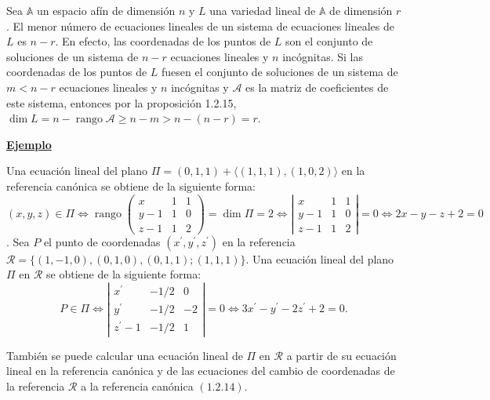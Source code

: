\documentclass[12pt, a4paper, ones, notitlepage, openany,titlepage]{article}
\newcommand{\ejemplo}{\noindent\underline{\textbf{Ejemplo}}}
\begin{document}
Sea $\mathbb{A}$ un espacio afín de dimensión $n$ y $L$ una variedad lineal de $\mathbb{A}$ de dimensión $r$. El menor número de ecuaciones lineales de un sistema de ecuaciones lineales de $L$ es $n-r$. En efecto, las coordenadas de los puntos de $L$ son el conjunto de soluciones de un sistema de $n-r$ ecuaciones lineales y $n$ incógnitas. Si las coordenadas de los puntos de $L$ fuesen el conjunto de soluciones de un sistema de $m<n-r$ ecuaciones lineales y $n$ incógnitas y $\mathcal{A}$ es la matriz de coeficientes de este sistema, entonces por la proposición 1.2.15, $\dim  L=n-\operatorname{rango} \mathcal{A} \geq n-m>n-(n-r)=r$.

\ejemplo

Una ecuación lineal del plano $\Pi=(0,1,1)+\langle(1,1,1),(1,0,2)\rangle$ en la referencia canónica se obtiene de la siguiente forma:
$(x, y, z) \in \Pi \Longleftrightarrow \operatorname{rango}\left(\begin{array}{ccc}x & 1 & 1 \\ y-1 & 1 & 0 \\ z-1 & 1 & 2\end{array}\right)=\dim  \Pi=2 \Longleftrightarrow\left|\begin{array}{ccc}x & 1 & 1 \\ y-1 & 1 & 0 \\ z-1 & 1 & 2\end{array}\right|=0 \Longleftrightarrow 2 x-y-z+2=0$.
Sea $P$ el punto de coordenadas $\left(x^{\prime}, y^{\prime}, z^{\prime}\right)$ en la referencia $\mathcal{R}=\{(1,-1,0),(0,1,0),(0,1,1) ;(1,1,1)\}$. Una ecuación lineal del plano $\Pi$ en $\mathcal{R}$ se obtiene de la siguiente forma:
$$
P \in \Pi \Longleftrightarrow\left|\begin{array}{ccr}
x^{\prime} & -1 / 2 & 0 \\
y^{\prime} & -1 / 2 & -2 \\
z^{\prime}-1 & -1 / 2 & 1
\end{array}\right|=0 \Longleftrightarrow 3 x^{\prime}-y^{\prime}-2 z^{\prime}+2=0 .
$$

También se puede calcular una ecuación lineal de $\Pi$ en $\mathcal{R}$ a partir de su ecuación lineal en la referencia canónica y de las ecuaciones del cambio de coordenadas de la referencia $\mathcal{R}$ a la referencia canónica $(1.2 .14)$.
\end{document}
